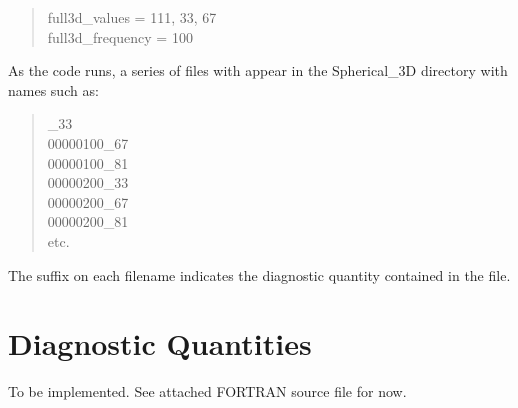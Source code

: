 \documentclass[12pt,letterpaper]{article}
\begin{document}
\blockquote{\noindent full3d\_values = 111, 33, 67
\\
\noindent full3d\_frequency = 100}

As the code runs, a series of files with appear in the Spherical\_3D directory with names such as:

\blockquote{\_33
\\
00000100\_67
\\
00000100\_81
\\
00000200\_33
\\
00000200\_67
\\
00000200\_81
\\
etc.
}

\noindent The suffix on each filename indicates the diagnostic quantity contained in the file.     


\section{Diagnostic Quantities}\label{sec:qvals}
To be implemented.  See attached FORTRAN source file for now.
\end{document}
